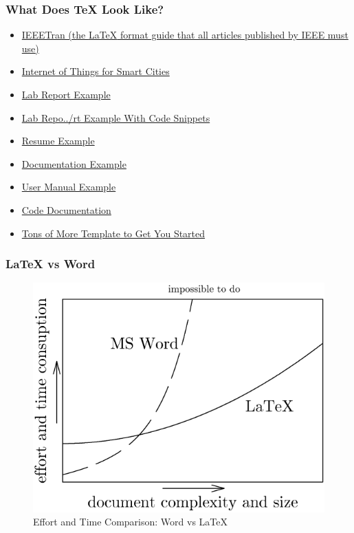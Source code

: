 \documentclass{beamer}
\begin{document}
\begin{frame}
  \frametitle{What Does {\TeX} Look Like?}
  \begin{itemize}
    \item
      \href{http://mirror.utexas.edu/ctan/macros/latex/contrib/IEEEtran/IEEEtran_HOWTO.pdf}{IEEETran
        (the {\LaTeX} format guide that all articles published by IEEE must use)}
    \item \href{https://ieeexplore.ieee.org/stamp/stamp.jsp?tp=&arnumber=6740844}{Internet of Things for Smart Cities}
    \item
      \href{../../example/sample_docs/emags_lab/output/lab_05.pdf}{Lab Report Example}
    \item
      \href{../../examples/sample_docs/signals_lab/report/output/final_project.pdf}{Lab
        Repo../rt Example With Code Snippets}
    \item
      \href{../../examples/sample_docs/resume/output/cv_4.pdf}{Resume Example}
    \item
      \href{../../examples/sample_docs/abet_documentation/docs/output/doc.pdf}{Documentation Example}
    \item
      \href{../../examples/sample_docs/abet_instruction_manual/instructions/output/manual.pdf}{User
        Manual Example}
    \item
      \href{../../examples/sample_docs/code_documentation/report/output/calculator.pdf}{Code
        Documentation}
    \item \href{https://www.overleaf.com/latex/templates}{Tons of More Template
        to Get You Started}

  \end{itemize}
\end{frame}

\begin{frame}
  \frametitle{{\LaTeX} vs Word}
  \begin{figure}
    \includegraphics[width=0.70\framewidth]{./img/latex_vs_word_graph.png}
    \caption{Effort and Time Comparison: Word vs {\LaTeX} \cite{pintric}}
  \end{figure}
\end{frame}
\end{document}
